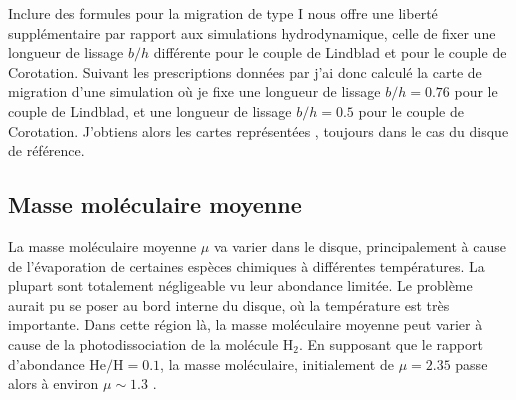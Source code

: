 Inclure des formules pour la migration de type I nous offre une liberté supplémentaire par rapport aux simulations hydrodynamique, celle de fixer une longueur de lissage $b/h$ différente pour le couple de Lindblad et pour le couple de Corotation. Suivant les prescriptions données par \cite{masset2002coorbital} j'ai donc calculé la carte de migration d'une simulation où je fixe une longueur de lissage $b/h=0.76$ pour le couple de Lindblad, et une longueur de lissage $b/h=0.5$ pour le couple de Corotation. J'obtiens alors les cartes représentées , toujours dans le cas du disque de référence. %




\subsection{Masse moléculaire moyenne}
La masse moléculaire moyenne $\mu$ va varier dans le disque, principalement à cause de l'évaporation de certaines
espèces chimiques à différentes températures. La plupart sont totalement négligeable vu leur abondance limitée. Le problème
aurait pu se poser au bord interne du disque, où la température est très importante. Dans cette région là, la masse moléculaire
moyenne peut varier à cause de la photodissociation de la molécule $\mathrm{H_2}$. En supposant que le rapport d'abondance
$\mathrm{He/H}=0.1$, la masse moléculaire, initialement de $\mu=2.35$ passe alors à environ $\mu\sim 1.3$ \citep[Annexe
A]{hure2000transition}.

